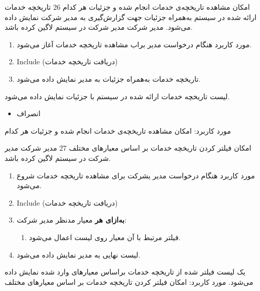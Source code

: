 \usecase
{امکان مشاهده تاریخچه‌‌ی خدمات انجام شده و جزئیات هر کدام}
{26}
{تاریخچه خدمات ارائه شده در سیستم به‌همراه جزئیات جهت گزارش‌گیری به مدیر شرکت نمایش داده می‌شود.}
{مدیر شرکت}
{}
{مدیر شرکت در سیستم لاگین کرده باشد.}
{
	\vspace*{-0.6cm}
	\begin{enumerate}
		\item مورد کاربرد هنگام درخواست مدیر براب مشاهده تاریخچه خدمات آغاز می‌شود.
		\item 
		Include (دریافت تاریخچه خدمات)
		\item 
		تاریخچه خدمات به‌همراه جزئیات به مدیر نمایش داده می‌شود.
	\end{enumerate}
}
{لیست تاریخچه خدمات ارائه شده در سیستم با جزئیات نمایش داده می‌شود.}
{
	\begin{itemize}
		\vspace*{-0.6cm}
		\item انصراف
	\end{itemize}
}
{
	مورد کاربرد: امکان مشاهده تاریخچه‌‌ی خدمات انجام شده و جزئیات هر کدام
}


\usecase
{امکان فیلتر کردن تاریخچه خدمات بر اساس معیارهای مختلف}
{27}
{}
{مدیر شرکت}
{}
{مدیر شرکت در سیستم لاگین کرده باشد.}
{
	\vspace*{-0.6cm}
	\begin{enumerate}
		\item مورد کاربرد هنگام درخواست مدیر یشرکت برای مشاهده تاریخچه خدمات شروع می‌شود.
		\item 
		Include (دریافت تاریخچه خدمات)
		\item
		\textbf{به‌ازای هر} معیار مدنظر مدیر شرکت:
		\begin{enumerate}[label=\theenumi.\arabic*.]
			\item فیلتر مرتبط با آن معیار روی لیست اعمال می‌شود.
		\end{enumerate}
		\item لیست نهایی به مدیر نمایش داده می‌شود.
	\end{enumerate}
}
{یک لیست فیلتر شده از تاریخچه خدمات براساس معیارهای وارد شده نمایش داده می‌شود.}
{
}
{
	مورد کاربرد: امکان فیلتر کردن تاریخچه خدمات بر اساس معیارهای مختلف
}

